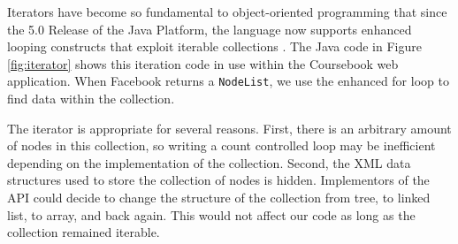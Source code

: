Iterators have become so fundamental to object-oriented programming that since 
the 5.0 Release of the Java Platform, the language now supports enhanced looping
constructs that exploit iterable collections \cite{JSR201}. The Java code in
Figure \ref{fig:iterator} shows this iteration code in use within the Coursebook
web application. When Facebook returns a \verb!NodeList!, we use the enhanced
for loop to find data within the collection.

The iterator is appropriate for several reasons. First, there is an arbitrary
amount of nodes in this collection, so writing a count controlled loop may be
inefficient depending on the implementation of the collection. Second, the XML
data structures used to store the collection of nodes is hidden. Implementors of
the API could decide to change the structure of the collection from tree, to
linked list, to array, and back again. This would not affect our code as long as
the collection remained iterable.
